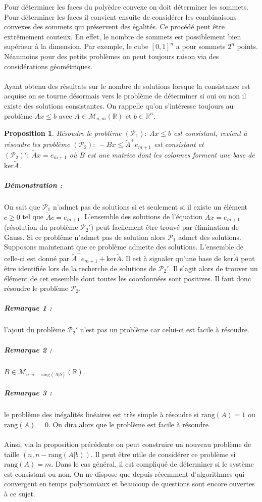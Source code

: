 \documentclass[10pt,a4paper]{article}
\newtheorem{prop}{Proposition}
\begin{document}
Pour déterminer les faces du polyèdre convexe on doit déterminer les sommets.
Pour déterminer les faces il convient ensuite de considérer les combinaisons convexes des sommets qui préservent des égalités.
Ce procédé peut être extrêmement couteux.
En effet, le nombre de sommets est possiblement bien supérieur à la dimension.
Par exemple, le cube $[0,1]^n$ a pour sommets $2^n$ points.
Néanmoins pour des petits problèmes on peut toujours raison via des considérations géométriques.\\
~\\
Ayant obtenu des résultats sur le nombre de solutions lorsque la consistance est acquise on se tourne désormais vers le problème de déterminer si oui ou non il existe des solutions consistantes.
On rappelle qu'on s'intéresse toujours au problème $Ax \le b$ avec $A \in \mathcal{M}_{n,m}(\mathbb{R})$ et $b \in \mathbb{R}^n$.
\begin{prop}
\label{propit}
Résoudre le problème $(\mathcal{P}_1): \ Ax \le b$ est consistant, revient à résoudre les problème $(\mathcal{P}_2): \ -Bx \le \tilde{A}^+ e_{m+1}$ est consistant et $(\mathcal{P}_2)' : \ \tilde{A} x=e_{m+1}$ où $B$ est une matrice dont les colonnes forment une base de $\text{ker}\tilde{A}$.
\end{prop}
\subparagraph{Démonstration :} On sait que $\mathcal{P}_1$ n'admet pas de solutions si et seulement si il existe un élément $c \ge 0$ tel que $\tilde{A}c=e_{m+1}$.
L'ensemble des solutions de l'équation $\tilde{A}x=e_{m+1}$ (résolution du problème $\mathcal{P}_2'$) peut facilement être trouvé par élimination de Gauss.
Si ce problème n'admet pas de solution alors $\mathcal{P}_1$ admet des solutions.
Supposons maintenant que ce problème admette des solutions.
L'ensemble de celle-ci est donné par $\tilde{A}^+e_{m+1}+\text{ker}\tilde{A}$.
Il est à signaler qu'une base de $\text{ker}\tilde{A}$ peut être identifiée lors de la recherche de solutions de $\mathcal{P}_2'$.
Il s'agit alors de trouver un élément de cet ensemble dont toutes les coordonnées sont positives.
Il faut donc résoudre le problème $\mathcal{P}_2$.\\
\subparagraph{Remarque 1 :} l'ajout du problème $\mathcal{P}_2'$ n'est pas un problème car celui-ci est facile à résoudre.
\subparagraph{Remarque 2 :} $B \in \mathcal{M}_{n,n-\text{rang}(A \vert b)}(\mathbb{R})$.
\subparagraph{Remarque 3 :} le problème des inégalités linéaires est très simple à résoudre si $\text{rang}(A)=1$ ou $\text{rang}(A)=0$.
On dira alors que le problème est facile à résoudre.\\
~\\
Ainsi, via la proposition précédente on peut construire un nouveau problème de taille $(n,n- \text{rang}(A \vert b))$.
Il peut être utile de considérer ce problème si $\text{rang}(A)=m$.
Dans le cas général, il est compliqué de déterminer si le système est consistant ou non.
On ne dispose que depuis récemment d'algorithmes qui convergent en temps polynomiaux et beaucoup de questions sont encore ouvertes à ce sujet.
\end{document}
